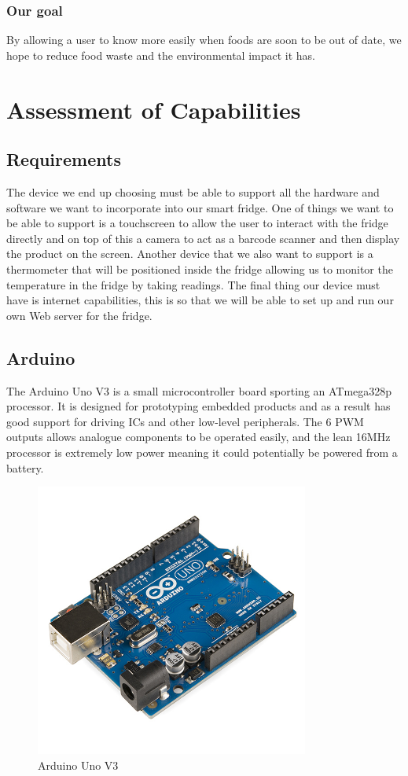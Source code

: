 \documentclass[10pt]{article}
\begin{document}
\subsubsection{Our goal}

By allowing a user to know more easily when foods are soon to be out of date, we hope to reduce food waste and the environmental impact it has.

\newpage
\section{Assessment of Capabilities}

\subsection{Requirements}

The device we end up choosing must be able to support all the hardware and software we want to incorporate into our smart fridge. One of things we want to be able to support is a touchscreen to allow the user to interact with the fridge directly and on top of this a camera to act as a barcode scanner and then display the product on the screen. Another device that we also want to support is a thermometer that will be positioned inside the fridge allowing us to monitor the temperature in the fridge by taking readings. The final thing our device must have is internet capabilities, this is so that we will be able to set up and run our own Web server for the fridge.

\subsection{Arduino}
The Arduino Uno V3 is a small microcontroller board sporting an ATmega328p processor. It is designed for prototyping embedded products and as a result has good support for driving ICs and other low-level peripherals. The 6 PWM outputs allows analogue components to be operated easily, and the lean 16MHz processor is extremely low power meaning it could potentially be powered from a battery.

\begin{figure}[h]
\centering
\caption{Arduino Uno V3}
\label{Arduino Uno V3}
\includegraphics[height=9cm]{images/Arduino.jpg}
\end{figure}
\end{document}
